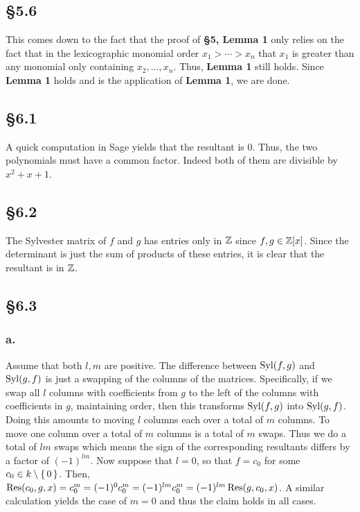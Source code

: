 \documentclass[letterpaper]{article}
\begin{document}
\subsection*{\S 5.6}

This comes down to the fact that the proof of \textbf{\S 5, Lemma 1} only relies on the fact that in the lexicographic monomial order $x_{1} > \cdots > x_{n}$ that $x_{1}$ is greater than any monomial only containing $x_{2}, \ldots, x_{n}$.
Thus, \textbf{Lemma 1} still holds.
Since \textbf{Lemma 1} holds and  is the application of \textbf{Lemma 1}, we are done.

\clearpage

\subsection*{\S 6.1}

A quick computation in Sage yields that the resultant is $0$.
Thus, the two polynomials must have a common factor.
Indeed both of them are divisible by $x^{2} + x + 1$.

\subsection*{\S 6.2}

The Sylvester matrix of $f$ and $g$ has entries only in $\mathbb{Z}$ since $f, g \in \mathbb{Z}[x]$.
Since the determinant is just the sum of products of these entries, it is clear that the resultant is in $\mathbb{Z}$.

\subsection*{\S 6.3}

\subsubsection*{a.}

Assume that both $l, m$ are positive.
The difference between $\operatorname{Syl}(f, g)$ and $\operatorname{Syl}(g, f)$ is just a swapping of the columns of the matrices.
Specifically, if we swap all $l$ columns with coefficients from $g$ to the left of the columns with coefficients in $g$, maintaining order, then this transforms $\operatorname{Syl}(f, g)$ into $\operatorname{Syl}(g, f)$.
Doing this amounts to moving $l$ columns each over a total of $m$ columns.
To move one column over a total of $m$ columns is a total of $m$ swaps.
Thus we do a total of $lm$ swaps which means the sign of the corresponding resultants differs by a factor of $(-1)^{lm}$.
Now suppose that $l = 0$, so that $f = c_{0}$ for some $c_{0} \in k \setminus \set{0}$.
Then, $\Res(c_{0}, g, x) = c_{0}^{m} = (-1)^{0} c_{0}^{m} = (-1)^{lm} c_{0}^{m} = (-1)^{lm} \Res(g, c_{0}, x)$.
A similar calculation yields the case of $m = 0$ and thus the claim holds in all cases.
\end{document}
